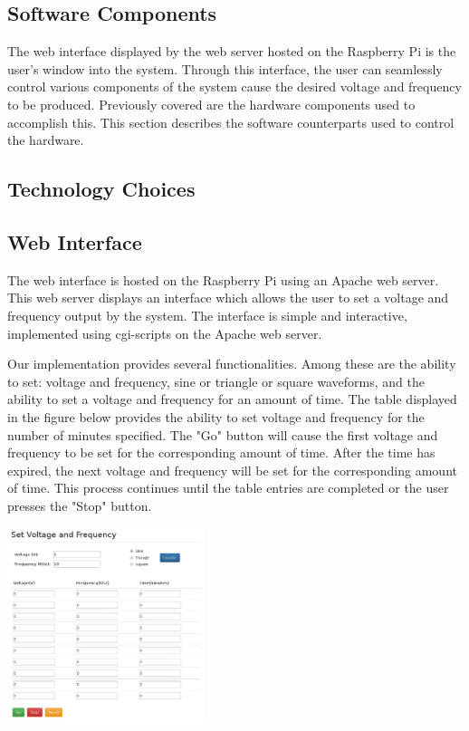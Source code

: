 \documentclass{article}	%
\begin{document}
\begin{multicols}{2}

\section{Software Components}
The web interface displayed by
the web server hosted on the Raspberry Pi
is the user's window into the system.
Through this interface,
the user can seamlessly control various
components of the system cause 
the desired voltage and frequency 
to be produced.
Previously covered are
the hardware components used to accomplish this.
This section describes the software counterparts
used to control the hardware.

\subsection{Technology Choices}

\subsection{Web Interface}
The web interface is hosted on the Raspberry Pi using an Apache web server.
This web server displays an interface which allows the user to
set a voltage and frequency output by the system. 
The interface is simple and interactive,
implemented using cgi-scripts on the Apache web server.

Our implementation provides several functionalities.
Among these are
the ability to set:
voltage and frequency,
sine or triangle or square waveforms,
and the ability to set a voltage and frequency for an amount of time.
The table displayed
in the figure below
provides the ability to set voltage and frequency for the number
of minutes specified.
The "Go" button will cause the first
voltage and frequency to be set for the corresponding amount of time.
After the time has expired,
the next voltage and frequency will be set for the corresponding amount of time.
This process continues until the table entries are completed or
the user presses the "Stop" button.

\begin{center}
\includegraphics[width=0.43\textwidth,keepaspectratio]{web_interface.pdf}
\end{center}


\end{multicols}
\end{document}
